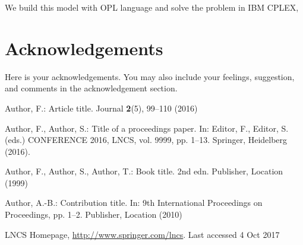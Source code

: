 \documentclass{llncs}
\begin{document}
We build this model with OPL language and solve the problem in IBM CPLEX, 


	
	\section*{Acknowledgements}
	
	Here is your acknowledgements. You may also include your feelings, suggestion, and comments in the acknowledgement section.
	
	\begin{thebibliography}{8}
		Author, F.: Article title. Journal \textbf{2}(5), 99--110 (2016)
		
		Author, F., Author, S.: Title of a proceedings paper. In: Editor,
		F., Editor, S. (eds.) CONFERENCE 2016, LNCS, vol. 9999, pp. 1--13.
		Springer, Heidelberg (2016).
		
		Author, F., Author, S., Author, T.: Book title. 2nd edn. Publisher,
		Location (1999)
		
		Author, A.-B.: Contribution title. In: 9th International Proceedings
		on Proceedings, pp. 1--2. Publisher, Location (2010)
		
		LNCS Homepage, \url{http://www.springer.com/lncs}. Last accessed 4
		Oct 2017
	\end{thebibliography}
\end{document}
